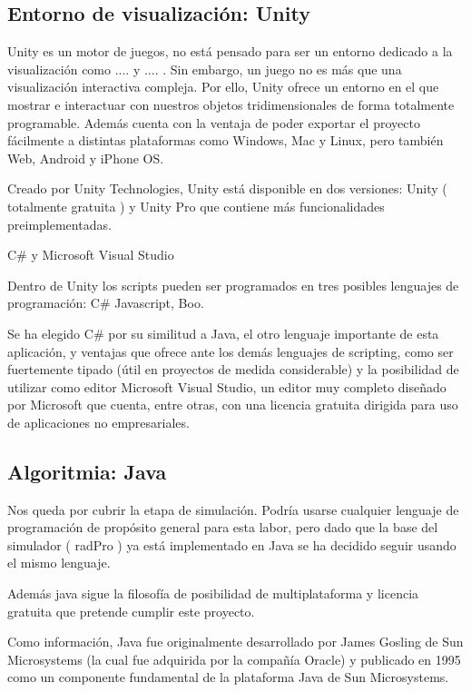 \documentclass[12pt,a4paper,openright,oneside]{article}
\numberwithin{equation}{section}
\theoremstyle{definition}
\begin{document}
\subsection{Entorno de visualización: Unity}

Unity es un motor de juegos, no está pensado para ser un entorno dedicado a la visualización como .... y .... . Sin embargo, un juego no es más que una visualización interactiva compleja. Por ello, Unity ofrece un entorno en el que mostrar e interactuar con nuestros objetos tridimensionales de forma totalmente programable. Además cuenta con la ventaja de poder exportar el proyecto fácilmente a distintas plataformas como Windows, Mac y Linux, pero también Web, Android y iPhone OS.

Creado por Unity Technologies, Unity está disponible en dos versiones: Unity ( totalmente gratuita ) y Unity Pro que contiene más funcionalidades preimplementadas.

C\# y Microsoft Visual Studio

Dentro de Unity los scripts pueden ser programados en tres posibles lenguajes de programación: C\# Javascript, Boo.

Se ha elegido C\# por su similitud a Java, el otro lenguaje importante de esta aplicación, y ventajas que ofrece ante los demás lenguajes de scripting, como ser fuertemente tipado (útil en proyectos de medida considerable) y la posibilidad de utilizar como editor Microsoft Visual Studio, un editor muy completo diseñado por Microsoft que cuenta, entre otras, con una licencia gratuita dirigida para uso de aplicaciones no empresariales.

\subsection{Algoritmia: Java}

Nos queda por cubrir la etapa de simulación. Podría usarse cualquier lenguaje de programación de propósito general para esta labor, pero dado que la base del simulador ( radPro ) ya está implementado en Java se ha decidido seguir usando el mismo lenguaje.

Además java sigue la filosofía de posibilidad de multiplataforma y licencia gratuita que pretende cumplir este proyecto.

Como información, Java fue originalmente desarrollado por James Gosling de Sun Microsystems (la cual fue adquirida por la compañía Oracle) y publicado en 1995 como un componente fundamental de la plataforma Java de Sun Microsystems. 
\end{document}
